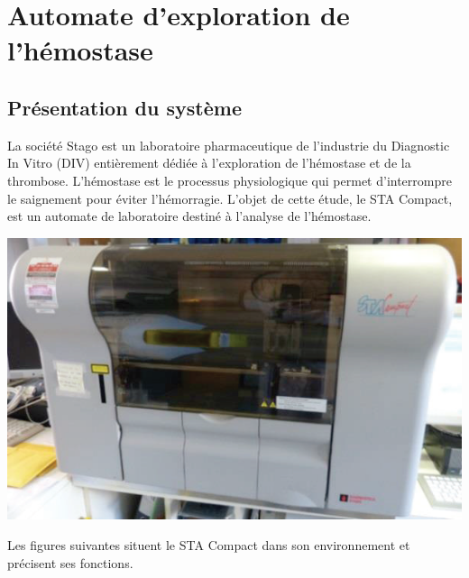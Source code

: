 \documentclass[10pt,fleqn]{article} %
\begin{document}

\vspace{5cm}
\pagestyle{fancy}
\thispagestyle{plain}

\def\columnseprulecolor{\color{ocre}}
\setlength{\columnseprule}{0.4pt} 


\section{Automate d’exploration de l’hémostase}
\subsection{Présentation du système}


\begin{minipage}[c]{.6\linewidth}
La société Stago est un laboratoire pharmaceutique de
l'industrie du Diagnostic In Vitro (DIV) entièrement
dédiée à l'exploration de l'hémostase et de la thrombose.
L'hémostase est le processus physiologique qui permet
d'interrompre le saignement pour éviter l'hémorragie.
L’objet de cette étude, le STA Compact, est un
automate de laboratoire destiné à l’analyse de
l’hémostase.
\end{minipage} \hfill
\begin{minipage}[c]{.35\linewidth}
\begin{center}
\includegraphics[width=\linewidth]{images/ccp_01}
\end{center}
\end{minipage} 

Les figures suivantes situent le STA Compact dans son environnement et précisent ses fonctions.
\end{document}
